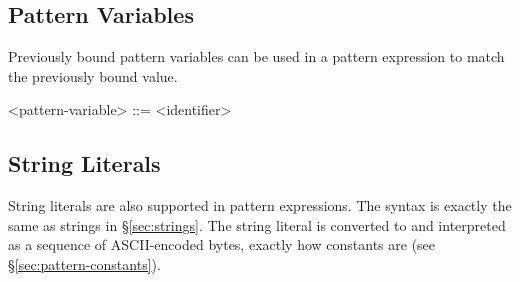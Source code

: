 \subsection{Pattern Variables}
Previously bound pattern variables can be used in a pattern expression to match the previously bound value.
\begin{grammar}
<pattern-variable> ::= <identifier>
\end{grammar}

\subsection{String Literals}
\label{sec:pattern-strings}
String literals are also supported in pattern expressions.  The syntax is exactly the same as strings in \S\ref{sec:strings}.  The string literal is converted to and interpreted as a sequence of ASCII-encoded bytes, exactly how constants are (see \S\ref{sec:pattern-constants}).  



